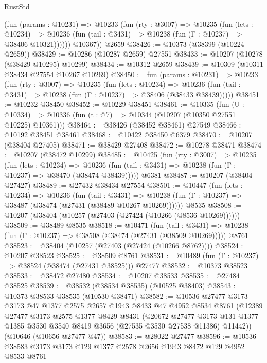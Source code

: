 \begin{lexlean}{RustStd}
\begin{coremodule}
          (fun (params : @10231) =>
          @10233
            (fun (rty : @3007) =>
            @10235
              (fun (lets : @10234) =>
              @10236 (fun (tail : @3431) => @10238 (fun (Γ : @10237) => @38406 @10321))))))
        @10367))
    @2659
@38426 := @10373 (@38399 (@10224 @2659))
@38429 := @10286 (@10287 @2659) @27551
@38433 := @10207 (@10278 (@38429 @10295) @10299)
@38434 := @10312 @2659
@38439 := @10309 (@10311 @38434 @27554 @10267 @10269)
@38450 := fun (params : @10231) =>
  @10233
    (fun (rty : @3007) =>
    @10235
      (fun (lets : @10234) =>
      @10236 (fun (tail : @3431) => @10238 (fun (Γ : @10237) => @38406 (@38433 @38439)))))
@38451 := @10232 @38450
@38452 := @10229 @38451
@38461 := @10335
    (fun (U : @10334) => @10336 (fun (t : @7) => @10344 (@10207 (@10350 @27551 @10225) @10361)))
@38464 := @38426 (@38452 @38461) @27549
@38466 := @10192 @38451 @38461
@38468 := @10422 @38450 @6379
@38470 := @10207 (@38404 @27405)
@38471 := @38429 @27408
@38472 := @10278 @38471
@38474 := @10207 (@38472 @10299)
@38485 := @10425
    (fun (rty : @3007) =>
    @10235
      (fun (lets : @10234) =>
      @10236 (fun (tail : @3431) => @10238 (fun (Γ : @10237) => @38470 (@38474 @38439)))))
    @6381
@38487 := @10207 (@38404 @27427)
@38489 := @27432 @38434 @27554
@38501 := @10447
    (fun (lets : @10234) =>
    @10236
      (fun (tail : @3431) =>
      @10238 (fun (Γ : @10237) => @38487 (@38474 (@27431 (@38489 @10267 @10269))))))
    @8535
@38508 := @10207 (@38404 (@10257 (@27403 (@27424 (@10266 (@8536 @10269))))))
@38509 := @38489 @8535
@38518 := @10471
    (fun (tail : @3431) => @10238 (fun (Γ : @10237) => @38508 (@38474 (@27431 (@38509 @10269)))))
    @8761
@38523 := @38404 (@10257 (@27403 (@27424 (@10266 @8762))))
@38524 := @10207 @38523
@38525 := @38509 @8761
@38531 := @10489 (fun (Γ : @10237) => @38524 (@38474 (@27431 @38525))) @27477
@38532 := @10373 @38523
@38533 := @38472 @27480
@38534 := @10207 @38533
@38535 := @27484 @38525
@38539 := @38532 (@38534 @38535) (@10525 @38403)
@38543 := @10373 @38533 @38535 (@10530 @38471)
@38582 := @10536
    @27477
    @3173
    @3173
    @47
    @1377
    @2575
    @2657
    @1943
    @8433
    @47
    @4952
    @8534
    @8761
    (@12389
      @27477
      @3173
      @2575
      @1377
      @8429
      @8431
      (@20672
        @27477
        @3173
        @131
        @1377
        @1385
        @3530
        @3540
        @8419
        @3656
        (@27535 @3530 @27538 @11386)
        @11442))
    (@10646 (@10656 @27477 @47))
@38583 := @28022 @27477
@38596 := @10536 @38583 @3173 @3173 @129 @1377 @2578 @2656 @1943 @8472 @129 @4952 @8533 @8761

\end{coremodule}
\end{lexlean}
